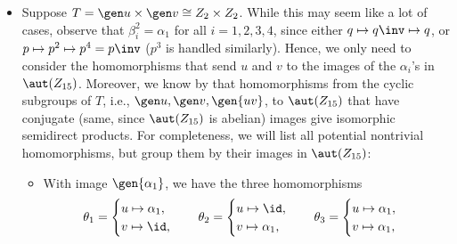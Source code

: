 \begin{solenum}
\begin{itemize}
\begin{enumerate}
\[            \]
            \item For $G_4 = Z_{15} \semidir_{\phi_4} Z_4$, we have $tpt\inv = p^2$ and $tqt\inv = q$.
	Since $q \in G_4$ is centralized, we have the factorization
            \[
            	G_4 \cong \gen{p, t} \times \gen q \cong F_{20} \times Z_3.
            \]
            \item For $G_5 = Z_{15} \semidir_{\phi_5} Z_4$, we have $tpt\inv = p^2$ and $tqt\inv = q\inv$.
	Then
            \[
            	G_5 \cong \set{p, q, t \mid p^5 = q^3 = t^4 = 1, pq = qp, tpt\inv = p^2, tqt\inv = q\inv} = F_{20} \semidir Z_3.
            \]
        \end{enumerate}
        \item Suppose $T = \gen u \times \gen v \cong Z_2 \times Z_2$.
        While this may seem like a lot of cases, observe that $\beta_i^2 = \alpha_1$ for all $i = 1, 2, 3, 4$, since either $q \mapsto q\inv \mapsto q$, or $p \mapsto p^2 \mapsto p^4 = p\inv$ ($p^3$ is handled similarly).
        Hence, we only need to consider the homomorphisms that send $u$ and $v$ to the images of the $\alpha_i$'s in $\aut(Z_{15})$.
        Moreover, we know by  that homomorphisms from the cyclic subgroups of $T$, i.e., $\gen u, \gen v, \gen{uv}$, to $\aut(Z_{15})$ that have conjugate (same, since $\aut(Z_{15})$ is abelian) images give isomorphic semidirect products.
        For completeness, we will list all potential nontrivial homomorphisms, but group them by their images in $\aut(Z_{15})$:
        \begin{itemize}
            \item With image $\gen{\alpha_1}$, we have the three homomorphisms
            \[
            	\theta_1 = 
                \begin{cases}
                    u \mapsto \alpha_1, \\
                    v \mapsto \id,
                \end{cases} \quad
                \theta_2 =
                \begin{cases}
                    u \mapsto \id, \\
                    v \mapsto \alpha_1,
                \end{cases} \quad
                \theta_3 =
                \begin{cases}
                    u \mapsto \alpha_1, \\
                    v \mapsto \alpha_1,
                \end{cases}
\]
\end{itemize}
\end{itemize}
\end{solenum}

